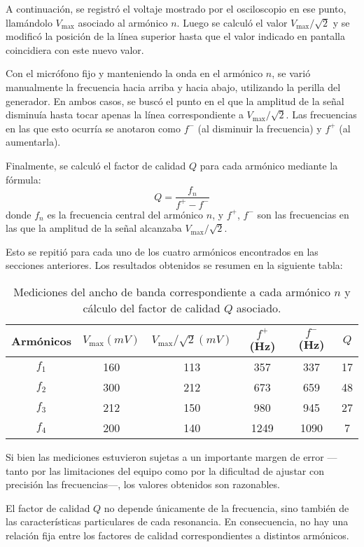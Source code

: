 \documentclass[12pt, a4paper]{article}
\begin{document}
A continuación, se registró el voltaje mostrado por el osciloscopio en ese punto, llamándolo $V_\mathrm{max}$ asociado al armónico $n$. Luego se calculó el valor $V_\mathrm{max}/\sqrt{2}$ y se modificó la posición de la línea superior hasta que el valor indicado en pantalla coincidiera con este nuevo valor.

Con el micrófono fijo y manteniendo la onda en el armónico $n$, se varió manualmente la frecuencia hacia arriba y hacia abajo, utilizando la perilla del generador. En ambos casos, se buscó el punto en el que la amplitud de la señal disminuía hasta tocar apenas la línea correspondiente a $V_\mathrm{max}/\sqrt{2}$. Las frecuencias en las que esto ocurría se anotaron como $f^-$ (al disminuir la frecuencia) y $f^+$ (al aumentarla).

Finalmente, se calculó el factor de calidad $Q$ para cada armónico mediante la fórmula:
$$Q = \frac{f_n}{f^+ - f^-}$$
donde $f_n$ es la frecuencia central del armónico $n$, y $f^+$, $f^-$ son las frecuencias en las que la amplitud de la señal alcanzaba $V_\mathrm{max}/\sqrt{2}$.

Esto se repitió para cada uno de los cuatro armónicos encontrados en las secciones anteriores. Los resultados obtenidos se resumen en la siguiente tabla:

\begin{table}[H]
    \centering
    \begin{tabular}{|c|c|c|c|c|c|}
    \hline
    \multirow{1}{2.1cm}{\centering Armónicos} 
        & $V_\mathrm{max} (mV)$
        & $V_\mathrm{max}/\sqrt{2} (mV)$ 
        & $f^+$ (Hz) 
        & $f^-$ (Hz)
        & $Q$ \\
    \hline
    $f_1$  & 160 & 113 & 357 & 337 & 17\\ \hline
    $f_2$  & 300 & 212 & 673 & 659 & 48\\ \hline
    $f_3$  & 212  & 150 & 980 & 945 & 27\\ \hline
    $f_4$  & 200  & 140 & 1249 & 1090 & 7\\ \hline
    \end{tabular}
    \caption{\centering Mediciones del ancho de banda correspondiente a cada armónico $n$ y cálculo del factor de calidad $Q$ asociado.}
    \label{tabla3}
\end{table}

Si bien las mediciones estuvieron sujetas a un importante margen de error —tanto por las limitaciones del equipo como por la dificultad de ajustar con precisión las frecuencias—, los valores obtenidos son razonables. 

El factor de calidad $Q$ no depende únicamente de la frecuencia, sino también de las características particulares de cada resonancia. En consecuencia, no hay una relación fija entre los factores de calidad correspondientes a distintos armónicos.
\end{document}
